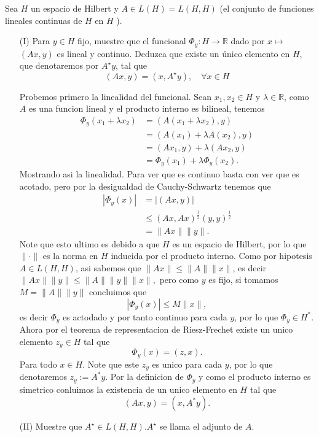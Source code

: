  Sea $H$ un espacio de Hilbert y $ A \in L(H)=L(H, H)$ (el conjunto de funciones lineales continuas de $H$ en $H$ ).
 \begin{itemize}
\item[(I)] Para $y \in H$ fijo, muestre que el funcional $\Phi_y: H \rightarrow \mathbb{R}$ dado por $x \mapsto$ $(A x, y)$ es lineal y continuo. Deduzca que existe un único elemento en $H$, que denotaremos por $A^{\star} y$, tal que
$$
(A x, y)=\left(x, A^{\star} y\right), \quad \forall x \in H
$$
\begin{sproof}
    Probemos primero la linealidad del funcional. Sean $x_1,x_2\in H$ y $\lambda\in \mathbb{R}$, como $A$ es una funcion lineal y el producto interno es bilineal, tenemos
    \begin{align*}
        \Phi_y(x_1+\lambda x_2)&=(A(x_1+\lambda x_2),y)\\
        &=(A(x_1)+\lambda A(x_2),y)\\
        &=(Ax_1,y)+\lambda(Ax_2,y)\\
        &=\Phi_y(x_1)+\lambda\Phi_y(x_2).
    \end{align*}
    Mostrando asi la linealidad. Para ver que es continuo basta con ver que es acotado, pero por la desigualdad de Cauchy-Schwartz  tenemos que
    \begin{align*}
        |\Phi_y(x)|&=|(Ax,y)|\\
        &\leq (Ax,Ax)^{\frac{1}{2}}(y,y)^\frac{1}{2}\\
        &=\|Ax\|\|y\|.
    \end{align*}
    Note que esto ultimo es debido a que $H$ es un espacio de Hilbert, por lo que $\|\cdot\|$ es la norma en $H$ inducida por el producto interno. Como por hipotesis $A\in L(H,H)$, asi sabemos que $\|Ax\|\leq \|A\|\|x\|$, es decir $\|Ax\|\|y\|\leq \|A\|\|y\|\|x\|,$ pero como $y$ es fijo, si tomamos $M=\|A\|\|y\|$ concluimos que
    $$|\Phi_y(x)|\leq M\|x\|,$$
    es decir $\Phi_y$ es actodado y por tanto continuo para cada $y$, por lo que $\Phi_y\in H^*.$ Ahora por el teorema de representacion de Riesz-Frechet existe un unico elemento $z_y\in H$ tal que
    $$\Phi_y(x)=(z,x).$$
    Para todo $x\in H.$ Note que este $z_y$ es unico para cada $y$, por lo que denotaremos $z_y:=A^*y$. Por la definicion de $\Phi_y$ y como el producto interno es simetrico conluimos la existencia de un unico elemento en $H$ tal que
    $$(Ax,y)=(x,A^*y).$$ 
\end{sproof}
\item[(II)] Muestre que $A^{\star} \in L(H,H) . A^{\star}$ se llama el adjunto de $A$.

\end{itemize}
